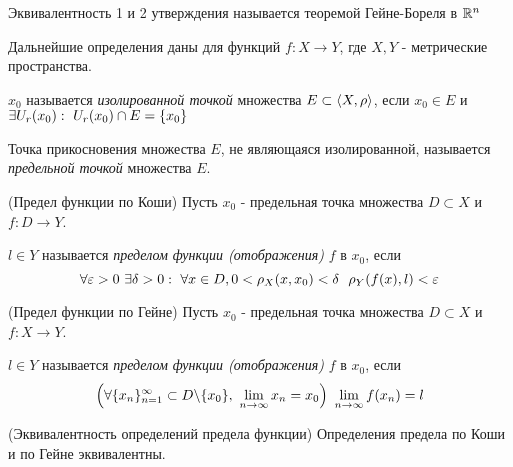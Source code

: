 \begin{note}
	Эквивалентность 1 и 2 утверждения называется теоремой Гейне-Бореля в $\mathbb{R}^n$
\end{note}

\begin{note}
	Дальнейшие определения даны для функций $f: X \to Y$, где $X, Y$ - метрические пространства.
\end{note}

\begin{definition}
	$x_0$ называется \textit{изолированной точкой} множества $E \subset \left\langle X, \rho\right\rangle$, если $x_0 \in E$ и $\exists U_r(x_0) :\  U_r(x_0) \cap E = \{x_0\}$
\end{definition}

\begin{definition}
	Точка прикосновения множества $E$, не являющаяся изолированной, называется \textit{предельной точкой} множества $E$.
\end{definition}

\begin{definition} (Предел функции по Коши)
	Пусть $x_0$ - предельная точка множества $D \subset X$ и $f: D \to Y$.
	
	$l \in Y$ называется \textit{пределом функции (отображения)} $f$ в $x_0$, если
	\[
		\forall \eps > 0\ \exists \delta > 0 \such \forall x \in D, 0 < \rho_X(x, x_0) < \delta\ \ \rho_Y(f(x), l) < \eps
	\]
\end{definition}

\begin{definition} (Предел функции по Гейне)
	Пусть $x_0$ - предельная точка множества $D \subset X$ и $f: X \to Y$.
	
	$l \in Y$ называется \textit{пределом функции (отображения)} $f$ в $x_0$, если
	\[
		\left(\forall \{x_n\}_{n = 1}^\infty \subset D \backslash \{x_0\},\ \lim\limits_{n \to \infty} x_n = x_0\right)\ \lim\limits_{n \to \infty} f(x_n) = l
	\]
\end{definition}

\begin{theorem} (Эквивалентность определений предела функции)
	Определения предела по Коши и по Гейне эквивалентны.
\end{theorem}

